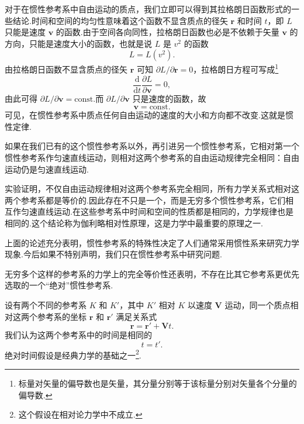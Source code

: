 对于在惯性参考系中自由运动的质点，我们立即可以得到其拉格朗日函数形式的一些结论.时间和空间的均匀性意味着这个函数不显含质点的径矢 $\boldsymbol{r}$ 和时间 $t$，即 $L$ 只能是速度 $\boldsymbol{v}$ 的函数.由于空间各向同性，拉格朗日函数也必是不依赖于矢量 $\boldsymbol{v}$ 的方向，只能是速度大小的函数，也就是说 $L$ 是 $v^2$ 的函数
\begin{equation}
  L=L(v^2).
\end{equation}
由拉格朗日函数不显含质点的径矢 $\boldsymbol{r}$ 可知 $\partial L/\partial\boldsymbol{r}=0$，拉格朗日方程可写成\footnote{标量对矢量的偏导数也是矢量，其分量分别等于该标量分别对矢量各个分量的偏导数.}
\begin{equation*}
  \frac{\mathrm{d}}{\mathrm{d}t}\frac{\partial L}{\partial\boldsymbol{v}}=0,
\end{equation*}
由此可得 $\partial L/\partial\boldsymbol{v}=\mathrm{const}$.而 $\partial L/\partial\boldsymbol{v}$ 只是速度的函数，故
\begin{equation}
  \boldsymbol{v}=\mathrm{const}.
\end{equation}
可见，在惯性参考系中质点任何自由运动的速度的大小和方向都不改变.这就是惯性定律.

如果在我们已有的这个惯性参考系以外，再引进另一个惯性参考系，它相对第一个惯性参考系作匀速直线运动，则相对这两个参考系的自由运动规律完全相同：自由运动仍是匀速直线运动.

实验证明，不仅自由运动规律相对这两个参考系完全相同，所有力学关系式相对这两个参考系都是等价的.因此存在不只是一个，而是无穷多个惯性参考系，它们相互作匀速直线运动.在这些参考系中时间和空间的性质都是相同的，力学规律也是相同的.这个结论称为伽利略相对性原理，这是力学中最重要的原理之一.

上面的论述充分表明，惯性参考系的特殊性决定了人们通常采用惯性系来研究力学现象.今后如果不特别声明，我们只在惯性参考系中研究问题.

无穷多个这样的参考系的力学上的完全等价性还表明，不存在比其它参考系更优先选取的一个“绝对”惯性参考系.

设有两个不同的参考系 $K$ 和 $K'$，其中 $K'$ 相对 $K$ 以速度 $\boldsymbol{V}$ 运动，同一个质点相对这两个参考系的坐标 $\boldsymbol{r}$ 和 $\boldsymbol{r}'$ 满足关系式
\begin{equation}
  \boldsymbol{r}=\boldsymbol{r}'+\boldsymbol{V}t.
\end{equation}
我们认为这两个参考系中的时间是相同的
\begin{equation}
  t=t'.
\end{equation}
绝对时间假设是经典力学的基础之一\footnote{这个假设在相对论力学中不成立.}.

